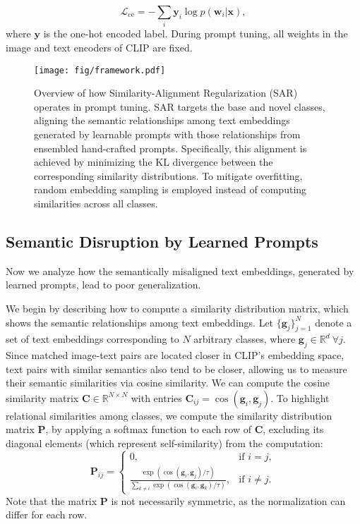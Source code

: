 \begin{equation}
\mathcal{L}_{\text{ce}}=-\sum_{i} \boldsymbol{y}_i \log p(\boldsymbol{w}_i|\boldsymbol{x}),
\end{equation}
where $\boldsymbol{y}$ is the one-hot encoded label. During prompt tuning, all weights in the image and text encoders of CLIP are fixed.

\begin{figure*}[ht]
    \setlength{\abovecaptionskip}{0.2cm}  
    \setlength{\belowcaptionskip}{-0.4cm} 
    \centering
    \texttt{[image: fig/framework.pdf]} 
    \caption{Overview of how Similarity-Alignment Regularization (SAR) operates in prompt tuning. SAR targets the base and novel classes, aligning the semantic relationships among text embeddings generated by learnable prompts with those relationships from ensembled hand-crafted prompts. Specifically, this alignment is achieved by minimizing the KL divergence between the corresponding similarity distributions. To mitigate overfitting, random embedding sampling is employed instead of computing similarities across all classes.}
    \label{fig:framework}
\end{figure*}

\subsection{Semantic Disruption by Learned Prompts}
Now we analyze how the semantically misaligned text embeddings, generated by learned prompts, lead to poor generalization.

 We begin by describing how to compute a similarity distribution matrix, which shows the semantic relationships among text embeddings. Let $\{\boldsymbol{g}_j\}_{j=1}^{N}$ denote a set of text embeddings corresponding to $N$ arbitrary classes, where $\boldsymbol{g}_j \in \mathbb{R}^{d}\ \forall j$. Since matched image-text pairs are located closer in CLIP’s embedding space, text pairs with similar semantics also tend to be closer, allowing us to measure their semantic similarities via cosine similarity. We can compute the cosine similarity matrix $\mathbf{C} \in \mathbb{R}^{N \times N}$ with entries $\mathbf{C}_{ij}=\cos(\boldsymbol{g}_i, \boldsymbol{g}_j)$. To highlight relational similarities among classes, we compute the similarity distribution matrix $\mathbf{P}$, by applying a softmax function to each row of $\mathbf{C}$, excluding its diagonal elements (which represent self-similarity) from the computation:
\begin{equation}
\mathbf{P}_{ij} =
\begin{cases} 
0, & \text{if } i = j, \\
\frac{\exp\left( \cos(\boldsymbol{g}_i, \boldsymbol{g}_j) / \tau \right)}{\sum_{k \neq i} \exp\left( \cos(\boldsymbol{g}_i, \boldsymbol{g}_k) / \tau \right)}, & \text{if } i \neq j.
\end{cases}
\end{equation}
Note that the matrix $\mathbf{P}$ is not necessarily symmetric, as the normalization can differ for each row.

